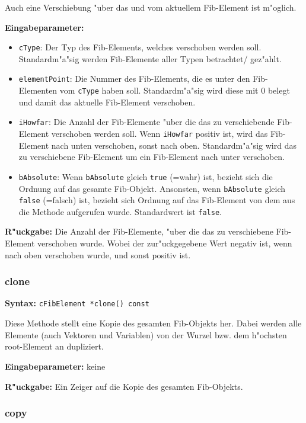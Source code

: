 Auch eine Verschiebung "uber das und vom aktuellem Fib-Element ist m"oglich.

\bigskip\noindent
\textbf{Eingabeparameter:}
\begin{itemize}
 \item \verb|cType|: Der Typ des Fib-Elements, welches verschoben werden soll. Standardm"a"sig werden Fib-Elemente aller Typen betrachtet/ gez"ahlt.
 \item \verb|elementPoint|: Die Nummer des Fib-Elements, die es unter den Fib-Elementen vom \verb|cType| haben soll. Standardm"a"sig wird diese mit $0$ belegt und damit das aktuelle Fib-Element verschoben.
 \item \verb|iHowfar|: Die Anzahl der Fib-Elemente "uber die das zu verschiebende Fib-Element verschoben werden soll. Wenn \verb|iHowfar| positiv ist, wird das Fib-Element nach unten verschoben, sonst nach oben. Standardm"a"sig wird das zu verschiebene Fib-Element um ein Fib-Element nach unter verschoben.
 \item \verb|bAbsolute|: Wenn \verb|bAbsolute| gleich \verb|true| (=wahr) ist, bezieht sich die Ordnung auf das gesamte Fib-Objekt. Ansonsten, wenn \verb|bAbsolute| gleich \verb|false| (=falsch) ist, bezieht sich Ordnung auf das Fib-Element von dem aus die Methode aufgerufen wurde. Standardwert ist \verb|false|.
\end{itemize}

\bigskip\noindent
\textbf{R"uckgabe:} Die Anzahl der Fib-Elemente, "uber die das zu verschiebene Fib-Element verschoben wurde. Wobei der zur"uckgegebene Wert negativ ist, wenn nach oben verschoben wurde, und sonst positiv ist.


\subsubsection{clone}

\textbf{Syntax:} \verb|cFibElement *clone() const|

\bigskip\noindent
Diese Methode stellt eine Kopie des gesamten Fib-Objekts her. Dabei werden alle Elemente (auch Vektoren und Variablen) von der Wurzel bzw. dem h"ochsten root-Element an dupliziert.

\bigskip\noindent
\textbf{Eingabeparameter:} keine

\bigskip\noindent
\textbf{R"uckgabe:} Ein Zeiger auf die Kopie des gesamten Fib-Objekts.


\subsubsection{copy}

